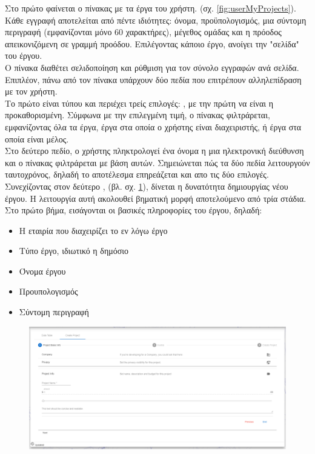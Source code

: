\pSpace Στο πρώτο  φαίνεται ο πίνακας με τα έργα του χρήστη. (σχ. \ref{fig:userMyProjects}). Κάθε εγγραφή αποτελείται από πέντε ιδιότητες: όνομα, προϋπολογισμός, μια σύντομη περιγραφή (εμφανίζονται μόνο 60 χαρακτήρες), μέγεθος ομάδας και η πρόοδος απεικονιζόμενη σε γραμμή προόδου.  Επιλέγοντας κάποιο έργο, ανοίγει την "σελίδα" του έργου.\\
\pSpace Ο πίνακα διαθέτει σελιδοποίηση και ρύθμιση για τον σύνολο εγγραφών ανά σελίδα. Επιπλέον, πάνω από τον πίνακα υπάρχουν δύο πεδία που επιτρέπουν αλληλεπίδραση με τον χρήστη.\\
\pSpace Το πρώτο είναι τύπου  και περιέχει τρείς επιλογές: , με την πρώτη να είναι η προκαθορισμένη. Σύμφωνα με την επιλεγμένη τιμή, ο πίνακας φιλτράρεται, εμφανίζοντας όλα τα έργα, έργα στα οποία ο χρήστης είναι διαχειριστής, ή έργα στα οποία είναι μέλος.\\
\pSpace Στο δεύτερο πεδίο, ο χρήστης πληκτρολογεί ένα όνομα η μια ηλεκτρονική διεύθυνση και ο πίνακας φιλτράρεται με βάση αυτών. Σημειώνεται πώς τα δύο πεδία λειτουργούν ταυτοχρόνος, δηλαδή το αποτέλεσμα επηρεάζεται και απο τις δύο επιλογές.\\

\pSpace Συνεχίζοντας στον δεύτερο ,  (βλ. σχ. \ref{fig:userCreateProject1}), δίνεται η δυνατότητα δημιουργίας νέου έργου. Η λειτουργία αυτή ακολουθεί βηματική μορφή αποτελούμενο από τρία στάδια.\\
\pSpace Στο πρώτο βήμα, εισάγονται οι βασικές πληροφορίες του έργου, δηλαδή:\\
\begin{itemize}
	\item Η εταιρία που διαχειρίζει το εν λόγω έργο
	\item Τύπο έργο, ιδιωτικό η δημόσιο
	\item Όνομα έργου
	\item Προυπολογισμός
	\item Σύντομη περιγραφή
\end{itemize}

\begin{figure}[!htb]
\includegraphics[width=\columnwidth, scale=4]{images/userCreateProject1.png}
\caption{}
\label{fig:userCreateProject1}
\end{figure}

